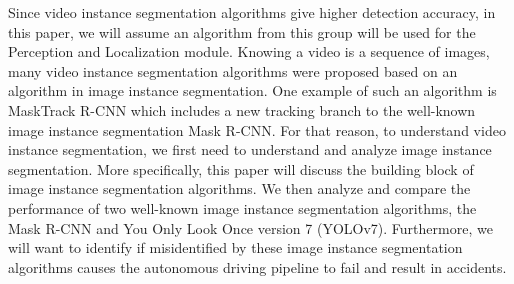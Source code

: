 Since video instance segmentation algorithms give higher detection accuracy, in this paper, we will assume an algorithm from this group will be used for the Perception and Localization module. Knowing a video is a sequence of images, many video instance segmentation algorithms were proposed based on an algorithm in image instance segmentation. One example of such an algorithm is MaskTrack R-CNN which includes a new tracking branch to the well-known image instance segmentation Mask R-CNN. For that reason, to understand video instance segmentation, we first need to understand and analyze image instance segmentation. More specifically, this paper will discuss the building block of image instance segmentation algorithms. We then analyze and compare the performance of two well-known image instance segmentation algorithms, the Mask R-CNN and You Only Look Once version 7 (YOLOv7). Furthermore, we will want to identify if misidentified by these image instance segmentation algorithms causes the autonomous driving pipeline to fail and result in accidents.
